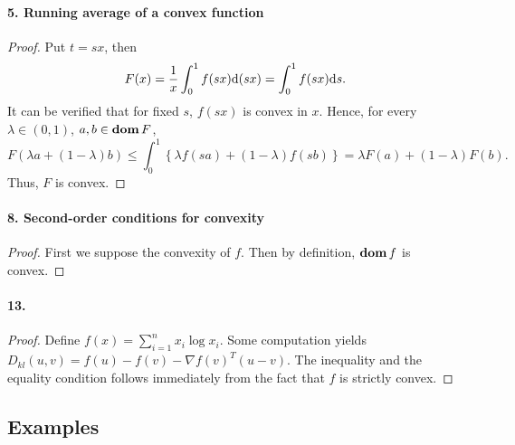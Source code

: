   \paragraph{5. Running average of a convex function}
  \begin{proof}
    Put $t=sx$, then
    \[
      F(x)=\frac{1}{x}\int_0^1f(sx)\mathrm{d}(sx)=\int_0^1f(sx)\mathrm{d} s.
    \]
    It can be verified that for fixed $s$, $f(sx)$ is convex in $x$. Hence, for
    every $\lambda\in(0,1)$, $a,b\in\operatorname{\mathbf{dom}} F$,
    \[
      F(\lambda a+(1-\lambda)b)\le
      \int_0^1\left\{\lambda f(sa)+(1-\lambda)f(sb) \right\}=
      \lambda F(a)+(1-\lambda)F(b).
    \]
    Thus, $F$ is convex.
  \end{proof}
  
  \paragraph{8. Second-order conditions for convexity}
  \begin{proof}
    First we suppose the convexity of $f$. Then by definition, $\operatorname{\mathbf{dom}} f$ is 
    convex.
  \end{proof}

  \paragraph{13.}
  \begin{proof}
    Define $f(x)=\sum_{i=1}^n x_i\log x_i$. Some computation yields $D_{kl}(u,v)
    =f(u)-f(v)-\nabla f(v)^T(u-v)$. The inequality and the equality condition
    follows immediately from the fact that $f$ is strictly convex.
  \end{proof}

\subsection{Examples}
